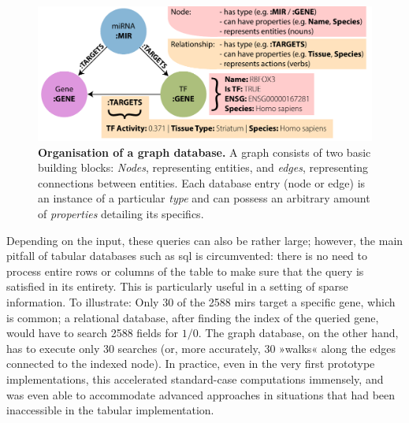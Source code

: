 \begin{figure}
\includegraphics[width=\textwidth]{figures/graph-org}
\caption[Graph database organisation.]{\textbf{Organisation of a graph database.} A graph consists of two basic building blocks: \textit{Nodes}, representing entities, and \textit{edges}, representing connections between entities. Each database entry (node or edge) is an instance of a particular \textit{type} and can possess an arbitrary amount of \textit{properties} detailing its specifics.
\label{fig:graph-org}}
\end{figure}

Depending on the input, these queries can also be rather large; however, the main pitfall of tabular databases such as \ac{sql} is circumvented: there is no need to process entire rows or columns of the table to make sure that the query is satisfied in its entirety. This is particularly useful in a setting of sparse information. To illustrate: Only 30 of the 2588 \acp{mir} target a specific gene, which is common; a relational database, after finding the index of the queried gene, would have to search 2588 fields for $1/0$. The graph database, on the other hand, has to execute only 30 searches (or, more accurately, 30 »walks« along the edges connected to the indexed node). In practice, even in the very first prototype implementations, this accelerated standard-case computations immensely, and was even able to accommodate advanced approaches in situations that had been inaccessible in the tabular implementation.

